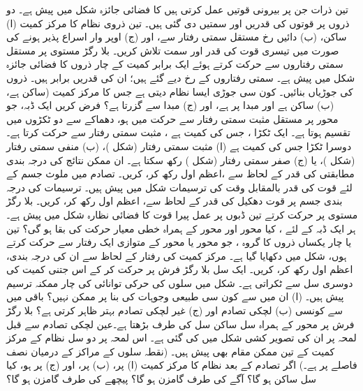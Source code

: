 \setcounter{questioncounter}{0}
تین ذرات جن پر بیرونی قوتیں عمل کرتی ہیں  کا فضائی جائزہ  شکل   میں  پیش  ہے۔ دو ذروں پر قوتوں کی قدریں اور سمتیں دی گئی ہیں۔ تین ذروی نظام  کا مرکز کمیت (ا) ساکن، (ب) دائیں رخ مستقل  سمتی رفتار سے، اور (ج) اوپر وار اسراع پذیر ہونے کی صورت میں تیسری قوت کی قدر اور سمت تلاش کریں۔
بلا رگڑ  مستوی  پر مستقل سمتی   رفتاروں سے  حرکت کرتے  ہوئے ایک برابر کمیت کے چار ذروں کا فضائی جائزہ    شکل  میں پیش ہے۔ سمتی رفتاروں کے رخ دیے گئے ہیں؛ ان کی قدریں برابر ہیں۔ ذروں کی جوڑیاں بنائیں۔ کون  سی جوڑی  ایسا نظام دیتی ہے جس کا مرکز کمیت (ساکن ہے، (ب)  ساکن ہے اور مبدا پر ہے، اور (ج) مبدا سے گزرتا ہے؟
فرض کریں ایک ڈبہ،   جو  محور پر  مستقل   مثبت سمتی رفتار سے حرکت میں ہو، دھماکے سے دو  ٹکڑوں  میں تقسیم ہوتا ہے۔  ایک  ٹکڑا ، جس کی کمیت  ہے ،  مثبت سمتی رفتار   سے حرکت کرتا ہے۔ دوسرا ٹکڑا جس کی کمیت  ہے  (ا)  مثبت سمتی رفتار    (شکل )، (ب) منفی سمتی رفتار  (شکل )، یا (ج)  صفر سمتی رفتار  (شکل ) رکھ سکتا ہے۔  ان ممکن نتائج کی درجہ بندی  مطابقتی  کی قدر  کے لحاظ سے ،اعظم اول  رکھ کر، کریں۔ 
تصادم میں ملوث  جسم کے لئے  قوت کی قدر بالمقابل وقت کی ترسیمات شکل  میں پیش ہیں۔ ترسیمات کی درجہ بندی  جسم پر قوت دھکیل کی قدر  کے لحاظ سے، اعظم اول رکھ کر،  کریں۔
بلا رگڑ مستوی پر حرکت کرتے    تین ڈبوں پر عمل پیرا قوت  کا  فضائی نظارہ شکل  میں پیش ہے۔ ہر ایک ڈبہ کے لئے ،  کیا   محور  اور محور  کے ہمراہ خطی معیار حرکت کی بقا ہو گی؟
تین یا  چار یکساں ذروں کا گروہ ، جو محور  یا محور  کے متوازی  ایک رفتار سے حرکت کرتے ہوں، شکل  میں دکھایا گیا ہے۔ مرکز کمیت کی رفتار کے لحاظ سے ان کی درجہ بندی، اعظم اول رکھ کر،  کریں۔
ایک سل بلا رگڑ فرش  پر حرکت کر کے اس جتنی کمیت کی دوسری سل سے  ٹکراتی ہے۔ شکل  میں سلوں کی حرکی توانائی   کی چار  ممکنہ ترسیم  پیش ہیں۔ (ا) ان میں سے کون سی طبیعی  وجوہات کی بنا پر  ممکن نہیں؟ باقی میں سے  کونسی (ب) لچکی تصادم اور (ج) غیر لچکی تصادم بہتر ظاہر کرتی ہے؟
بلا رگڑ فرش پر محور  کے ہمراہ   سل     ساکن  سل  کی طرف بڑھتا ہے۔عین لچکی تصادم سے  قبل لمحہ پر   ان کی تصویر کشی شکل  میں  کی گئی  ہے۔ اس لمحہ پر دو  سل نظام کے مرکز کمیت کے تین ممکن مقام بھی پیش  ہیں۔ (نقطہ      سلوں کے مراکز کے  درمیان  نصف فاصلے پر ہے۔)  اگر  تصادم کے بعد نظام کا مرکز کمیت  (ا)  پر، (ب)  پر، اور (ج)  پر ہو، کیا سل  ساکن  ہو گا؟ آگے  کی طرف گامزن ہو گا؟     پیچھے کی طرف گامزن ہو گا؟
